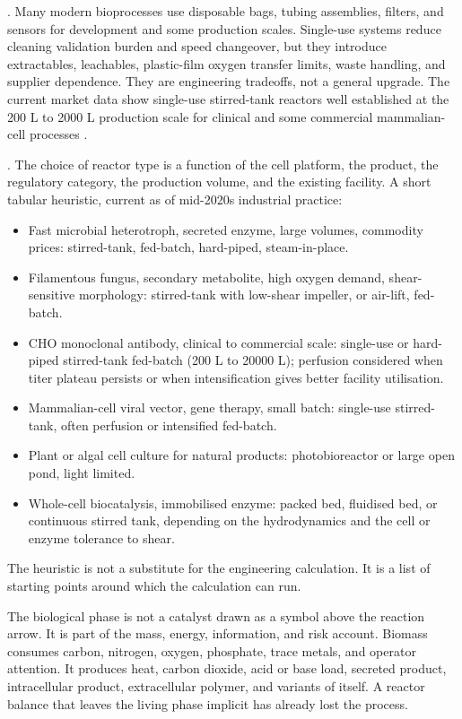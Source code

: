. Many modern bioprocesses use disposable
bags, tubing assemblies, filters, and sensors for development and some
production scales. Single-use systems reduce cleaning validation burden
and speed changeover, but they introduce extractables, leachables,
plastic-film oxygen transfer limits, waste handling, and supplier
dependence. They are engineering tradeoffs, not a general upgrade. The
current market data show single-use stirred-tank reactors well
established at the 200 L to 2000 L production scale for clinical and
some commercial mammalian-cell processes
\cite{paper:v6c10-walsh-biopharmaceuticals-2022}.

. The choice of reactor type is a
function of the cell platform, the product, the regulatory category,
the production volume, and the existing facility. A short tabular
heuristic, current as of mid-2020s industrial practice:

\begin{itemize}[leftmargin=*]
\item Fast microbial heterotroph, secreted enzyme, large volumes,
  commodity prices: stirred-tank, fed-batch, hard-piped, steam-in-place.
\item Filamentous fungus, secondary metabolite, high oxygen demand,
  shear-sensitive morphology: stirred-tank with low-shear impeller, or
  air-lift, fed-batch.
\item CHO monoclonal antibody, clinical to commercial scale: single-use
  or hard-piped stirred-tank fed-batch (200 L to 20000 L); perfusion
  considered when titer plateau persists or when intensification gives
  better facility utilisation.
\item Mammalian-cell viral vector, gene therapy, small batch:
  single-use stirred-tank, often perfusion or intensified fed-batch.
\item Plant or algal cell culture for natural products: photobioreactor
  or large open pond, light limited.
\item Whole-cell biocatalysis, immobilised enzyme: packed bed,
  fluidised bed, or continuous stirred tank, depending on the
  hydrodynamics and the cell or enzyme tolerance to shear.
\end{itemize}

The heuristic is not a substitute for the engineering calculation. It
is a list of starting points around which the calculation can run.

\begin{archetype}
The biological phase is not a catalyst drawn as a symbol above the
reaction arrow. It is part of the mass, energy, information, and risk
account. Biomass consumes carbon, nitrogen, oxygen, phosphate, trace
metals, and operator attention. It produces heat, carbon dioxide, acid
or base load, secreted product, intracellular product, extracellular
polymer, and variants of itself. A reactor balance that leaves the
living phase implicit has already lost the process.
\end{archetype}

